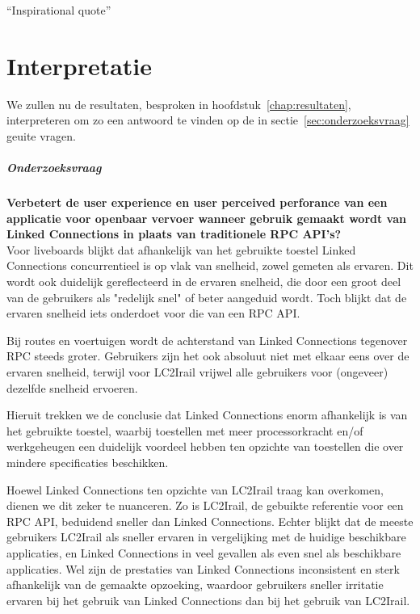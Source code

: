 \begin{savequote}[0.55\linewidth]
	``Inspirational quote''
\end{savequote}

\chapter{Interpretatie}
\label{chap:interpretatie}

We zullen nu de resultaten, besproken in hoofdstuk~\ref{chap:resultaten}, interpreteren om zo een antwoord te vinden op de in sectie~\ref{sec:onderzoeksvraag} geuite vragen.

\paragraph{Onderzoeksvraag}  \textbf{Verbetert de user experience en user perceived perforance van een applicatie voor openbaar vervoer wanneer gebruik gemaakt wordt van Linked Connections in plaats van traditionele RPC API's?}\\

Voor liveboards blijkt dat afhankelijk van het gebruikte toestel Linked Connections concurrentieel is op vlak van snelheid, zowel gemeten als ervaren. Dit wordt ook duidelijk gereflecteerd in de ervaren snelheid, die door een groot deel van de gebruikers als "redelijk snel" of beter aangeduid wordt. Toch blijkt dat de ervaren snelheid iets onderdoet voor die van een RPC API.

Bij routes en voertuigen wordt de achterstand van Linked Connections tegenover RPC steeds groter. Gebruikers zijn het ook absoluut niet met elkaar eens over de ervaren snelheid, terwijl voor LC2Irail vrijwel alle gebruikers voor (ongeveer) dezelfde snelheid ervoeren.

Hieruit trekken we de conclusie dat Linked Connections enorm afhankelijk is van het gebruikte toestel,  waarbij toestellen met meer processorkracht en/of werkgeheugen een duidelijk voordeel hebben ten opzichte van toestellen die over mindere specificaties beschikken.

Hoewel Linked Connections ten opzichte van LC2Irail traag kan overkomen, dienen we dit zeker te nuanceren. Zo is LC2Irail, de gebuikte referentie voor een RPC API, beduidend sneller dan Linked Connections. Echter blijkt dat de meeste gebruikers LC2Irail als sneller ervaren in vergelijking met de huidige beschikbare applicaties, en Linked Connections in veel gevallen als even snel als beschikbare applicaties. Wel zijn de prestaties van Linked Connections inconsistent en sterk afhankelijk van de gemaakte opzoeking, waardoor gebruikers sneller irritatie ervaren bij het gebruik van Linked Connections dan bij het gebruik van LC2Irail.

